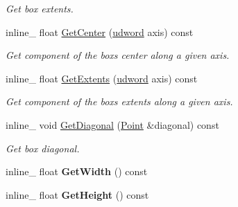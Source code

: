 \begin{DoxyCompactItemize}
\begin{DoxyCompactList}\small\item\em Get box extents. \end{DoxyCompactList}\item 
inline\+\_\+ float \hyperlink{classOpcode_1_1AABB_aee39d809e7aa6e221a27de75ba0e5160}{Get\+Center} (\hyperlink{IceTypes_8h_a44c6f1920ba5551225fb534f9d1a1733}{udword} axis) const \hypertarget{classOpcode_1_1AABB_aee39d809e7aa6e221a27de75ba0e5160}{}\label{classOpcode_1_1AABB_aee39d809e7aa6e221a27de75ba0e5160}

\begin{DoxyCompactList}\small\item\em Get component of the box\textquotesingle{}s center along a given axis. \end{DoxyCompactList}\item 
inline\+\_\+ float \hyperlink{classOpcode_1_1AABB_a42db4e26211463b9d796095ab03875ee}{Get\+Extents} (\hyperlink{IceTypes_8h_a44c6f1920ba5551225fb534f9d1a1733}{udword} axis) const \hypertarget{classOpcode_1_1AABB_a42db4e26211463b9d796095ab03875ee}{}\label{classOpcode_1_1AABB_a42db4e26211463b9d796095ab03875ee}

\begin{DoxyCompactList}\small\item\em Get component of the box\textquotesingle{}s extents along a given axis. \end{DoxyCompactList}\item 
inline\+\_\+ void \hyperlink{classOpcode_1_1AABB_af18c597f5e7dd08562dbfc74994a896b}{Get\+Diagonal} (\hyperlink{classOpcode_1_1Point}{Point} \&diagonal) const \hypertarget{classOpcode_1_1AABB_af18c597f5e7dd08562dbfc74994a896b}{}\label{classOpcode_1_1AABB_af18c597f5e7dd08562dbfc74994a896b}

\begin{DoxyCompactList}\small\item\em Get box diagonal. \end{DoxyCompactList}\item 
inline\+\_\+ float {\bfseries Get\+Width} () const \hypertarget{classOpcode_1_1AABB_ad6eafbfdf50b700bf67ecc8398972ff0}{}\label{classOpcode_1_1AABB_ad6eafbfdf50b700bf67ecc8398972ff0}

\item 
inline\+\_\+ float {\bfseries Get\+Height} () const \hypertarget{classOpcode_1_1AABB_aebac63c661210cb32a08d1c1d0152b35}{}\label{classOpcode_1_1AABB_aebac63c661210cb32a08d1c1d0152b35}


\end{DoxyCompactItemize}

